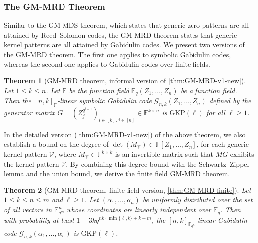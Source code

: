 \documentclass[11pt]{article}
\theoremstyle{plain}
\newtheorem{thm}{Theorem}[section]
\theoremstyle{definition}
\theoremstyle{remark}
\newcommand{\F}{\mathbb{F}}
\def \mG {\mathcal{G}}
\begin{document}
\subsubsection{The GM-MRD Theorem}\label{gmmrdsub}

Similar to the GM-MDS theorem, which states that generic zero patterns are all attained by Reed--Solomon codes, the GM-MRD theorem states that generic kernel patterns are all attained by Gabidulin codes. We present two versions of the GM-MRD theorem. The first one applies to symbolic Gabidulin codes, whereas the second one applies to Gabidulin codes over finite fields. 

\begin{thm}[GM-MRD theorem, informal version of \cref{thm:GM-MRD-v1-new}]\label{gmmrdthm}
Let $1\leq k\leq n$.
Let $\F$ be the function field $\F_q(Z_1,\dots,Z_n)$ be a function field. 
Then the $[n,k]_{\F}$-linear symbolic Gabidulin code $\mG_{n,k}(Z_1,\dots,Z_n)$ defined by the generator matrix $G=\left(Z_j^{q^{i-1}}\right)_{i\in [k], j\in [n]}\in \F^{k\times n}$ is $\mathrm{GKP}(\ell)$ for all $\ell\geq 1$.
\end{thm}

In the detailed version (\cref{thm:GM-MRD-v1-new}) of the above theorem, we also establish a bound on the degree of $\det(M_\mathcal{V})\in\F[Z_1,\dots,Z_n]$, for each generic kernel pattern $\mathcal{V}$, where $M_\mathcal{V}\in\F^{k\times k}$ is an invertible matrix such that $MG$ exhibits the kernel pattern $\mathcal{V}$. By combining this degree bound with the Schwartz--Zippel lemma and the union bound, we derive the finite field GM-MRD theorem.

\begin{thm}[GM-MRD theorem, finite field version, \cref{thm:GM-MRD-finite}]
Let $1\leq k\leq n\leq m$ and $\ell\geq 1$. Let $(\alpha_1,\dots,\alpha_n)$ be uniformly distributed over the set of all vectors in $\F_{q^m}^n$ whose coordinates are linearly independent over $\F_q$. Then with probability at least $1-3kq^{nk\cdot\min\{\ell,k\}+k-m}$, the $[n,k]_{\F_{q^m}}$-linear Gabidulin code $\mG_{n,k}(\alpha_1,\dots, \alpha_n)$ is $\mathrm{GKP}(\ell)$.
\end{thm}

\end{document}

